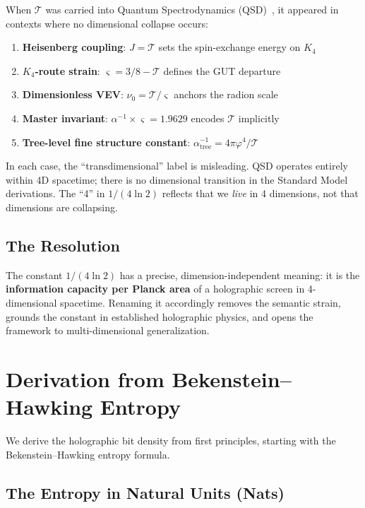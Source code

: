 \documentclass[11pt,a4paper]{article}
\theoremstyle{plain}
\theoremstyle{definition}
\newcommand{\Tc}{\mathcal{T}}
\newcommand{\strain}{\varsigma}
\newcommand{\nurad}{\nu_0}
\begin{document}
When $\Tc$ was carried into Quantum Spectrodynamics (QSD)~\cite{Hubka2026QSD}, it appeared in contexts where no dimensional collapse occurs:

\begin{enumerate}[nosep]
    \item \textbf{Heisenberg coupling}: $J = \Tc$ sets the spin-exchange energy on $K_4$
    \item \textbf{$K_4$-route strain}: $\strain = 3/8 - \Tc$ defines the GUT departure
    \item \textbf{Dimensionless VEV}: $\nurad = \Tc/\strain$ anchors the radion scale
    \item \textbf{Master invariant}: $\alpha^{-1} \times \strain = 1.9629$ encodes $\Tc$ implicitly
    \item \textbf{Tree-level fine structure constant}: $\alpha^{-1}_{\text{tree}} = 4\pi\varphi^4/\Tc$
\end{enumerate}

In each case, the ``transdimensional'' label is misleading. QSD operates entirely within 4D spacetime; there is no dimensional transition in the Standard Model derivations. The ``4'' in $1/(4\ln 2)$ reflects that we \emph{live} in 4 dimensions, not that dimensions are collapsing.

\subsection{The Resolution}

The constant $1/(4\ln 2)$ has a precise, dimension-independent meaning: it is the \textbf{information capacity per Planck area} of a holographic screen in 4-dimensional spacetime. Renaming it accordingly removes the semantic strain, grounds the constant in established holographic physics, and opens the framework to multi-dimensional generalization.

\section{Derivation from Bekenstein--Hawking Entropy}
\label{sec:derivation}

We derive the holographic bit density from first principles, starting with the Bekenstein--Hawking entropy formula.

\subsection{The Entropy in Natural Units (Nats)}
\end{document}
